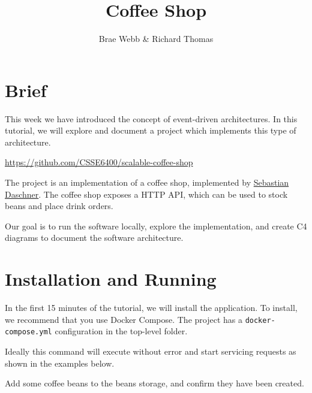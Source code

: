 \documentclass{csse4400}
\title{Coffee Shop}
\author{Brae Webb \& Richard Thomas}
\date{\week[tutorial]{6}}
\begin{document}
\maketitle

\section{Brief}

This week we have introduced the concept of event-driven architectures.
In this tutorial, we will explore and document a project which implements this type of architecture.

\url{https://github.com/CSSE6400/scalable-coffee-shop}

\noindent
The project is an implementation of a coffee shop, implemented by 
\href{https://github.com/sdaschner/scalable-coffee-shop}{Sebastian Daschner}.
The coffee shop exposes a HTTP API, which can be used to stock beans and place drink orders.

Our goal is to run the software locally, explore the implementation,
and create C4 diagrams to document the software architecture.

\section{Installation and Running}

In the first 15 minutes of the tutorial, we will install the application.
To install, we recommend that you use Docker Compose.
The project has a \texttt{docker-compose.yml} configuration in the top-level folder.


\noindent
Ideally this command will execute without error and start servicing requests as shown in the examples below.

\vspace{2mm}

\vspace{1mm}
\noindent
Add some coffee beans to the beans storage, and confirm they have been created.
\end{document}
